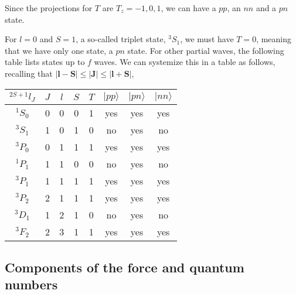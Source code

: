 \documentclass[graybox,sectrefs,envcountresetchap,open=right]{svmonodo}
\begin{document}
Since the projections for $T$ are $T_z=-1,0,1$, we can have a $pp$, an $nn$ and a $pn$ state.

For $l=0$ and $S=1$, a so-called triplet state, $^3S_1$, we must have $T=0$, meaning that we have only one state, a $pn$ state. For other partial waves, the following table lists states up to $f$ waves.
We can systemize this in a table as follows, recalling that $|\mathbf{l}-\mathbf{S}| \le |\mathbf{J}| \le |\mathbf{l}+\mathbf{S}|$,  

\begin{center}

\begin{tabular}{cccccccc}
\hline
\multicolumn{1}{c}{ $^{2S+1}l_J$ } & \multicolumn{1}{c}{ $J$ } & \multicolumn{1}{c}{ $l$ } & \multicolumn{1}{c}{ $S$ } & \multicolumn{1}{c}{ $T$ } & \multicolumn{1}{c}{ $\vert pp\rangle$ } & \multicolumn{1}{c}{ $\vert pn\rangle$ } & \multicolumn{1}{c}{ $\vert nn\rangle$ } \\
\hline
$^{1}S_0$    & 0   & 0   & 0   & 1   & yes               & yes               & yes               \\
$^{3}S_1$    & 1   & 0   & 1   & 0   & no                & yes               & no                \\
$^{3}P_0$    & 0   & 1   & 1   & 1   & yes               & yes               & yes               \\
$^{1}P_1$    & 1   & 1   & 0   & 0   & no                & yes               & no                \\
$^{3}P_1$    & 1   & 1   & 1   & 1   & yes               & yes               & yes               \\
$^{3}P_2$    & 2   & 1   & 1   & 1   & yes               & yes               & yes               \\
$^{3}D_1$    & 1   & 2   & 1   & 0   & no                & yes               & no                \\
$^{3}F_2$    & 2   & 3   & 1   & 1   & yes               & yes               & yes               \\
\hline
\end{tabular}

\end{center}

\subsection{Components of the force and quantum numbers}
\end{document}
